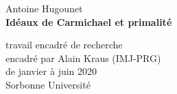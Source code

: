 \begin{center}
	\large Antoine Hugounet \\

	\vspace{30px}
	\LARGE \textbf{Idéaux de Carmichael et primalité}

	\vspace{30px}
	\large
	travail encadré de recherche \\
	encadré par Alain Kraus (IMJ-PRG) \\
	de janvier à juin 2020 \\

	\vspace{20px}
	Sorbonne Université

	\vspace{0.5cm}
	\begin{center}
	\end{center}

	\normalsize
	\renewcommand{\contentsname}{}
	\vspace{10px}
	\tableofcontents
\end{center}
